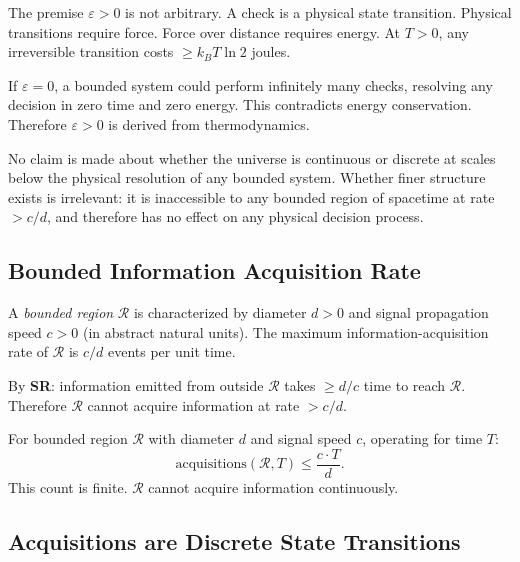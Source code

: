 The premise $\varepsilon > 0$ is not arbitrary. A check is a physical state transition. Physical transitions require force. Force over distance requires energy. At $T > 0$, any irreversible transition costs $\geq k_B T \ln 2$ joules.

If $\varepsilon = 0$, a bounded system could perform infinitely many checks, resolving any decision in zero time and zero energy. This contradicts energy conservation. Therefore $\varepsilon > 0$ is derived from thermodynamics.

\begin{remark}[Scope]
No claim is made about whether the universe is continuous or discrete at scales
below the physical resolution of any bounded system. Whether finer structure
exists is irrelevant: it is inaccessible to any bounded region of spacetime at
rate $> c/d$, and therefore has no effect on any physical decision process.
\end{remark}

\subsection{Bounded Information Acquisition Rate}\label{sec:bounded-acquisition}

\begin{proposition}\label{prop:bounded-region}
A \emph{bounded region} $\mathcal{R}$ is characterized by diameter $d > 0$ and
signal propagation speed $c > 0$ (in abstract natural units). The maximum
information-acquisition rate of $\mathcal{R}$ is $c/d$ events per unit time.

By \textbf{SR}: information emitted from outside $\mathcal{R}$ takes $\geq d/c$
time to reach $\mathcal{R}$. Therefore $\mathcal{R}$ cannot acquire information
at rate $> c/d$.
\end{proposition}

\begin{theorem}\label{thm:bounded-acquisition}
For bounded region $\mathcal{R}$ with diameter $d$ and signal speed $c$,
operating for time $T$:
\[
\text{acquisitions}(\mathcal{R}, T) \leq \frac{c \cdot T}{d}.
\]
This count is finite. $\mathcal{R}$ cannot acquire information continuously.
\end{theorem}

\subsection{Acquisitions are Discrete State Transitions}\label{sec:discrete-transitions}

